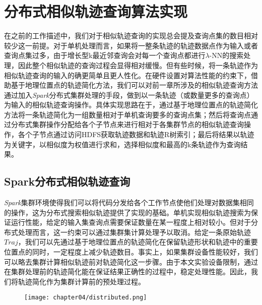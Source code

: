 

\section{分布式相似轨迹查询算法实现}
\label{sec:distributed algo}
在之前的工作描述中，我们对于相似轨迹查询的实现总会提及查询点集的数目相对较少这一前提。对于单机处理而言，如果将一整条轨迹的轨迹数据点作为输入或者查询点集过多，由于增长型k最近邻查询会对每一个查询点都进行$\lambda$-NN的搜索处理，因此整个相似轨迹的查询过程会显得相对缓慢。但有些时候，将一条轨迹作为相似轨迹查询的输入的确更简单且更人性化\cite{shang2014personalized}。在硬件设置对算法性能的约束下，借助基于地理位置点的轨迹简化方法，我们可以对前一章所涉及的相似轨迹查询方法通过加入\emph{Spark}分布式集群处理的手段，做到以一条轨迹（或数量更多的查询点）为输入的相似轨迹查询操作。具体实现思路在于，通过基于地理位置点的轨迹简化方法将一条轨迹简化为一组数量相对于单机查询要多的查询点集；然后将查询点通过分布式集群操作分配给各个子节点来进行相对于各集群节点的相似轨迹查询操作，各个子节点通过访问HDFS获取轨迹数据和轨迹R树索引；最后将结果以轨迹为关键字，以相似度为权值进行求和，选择相似度和最高的k条轨迹作为查询结果。


\subsection{Spark分布式相似轨迹查询}
\label{subsec:distributed similar}
\emph{Spark}集群环境使得我们可以将代码分发给各个工作节点使他们处理对数据集相同的操作，这为分布式搜索相似轨迹提供了实现的基础。单机实现相似轨迹搜索为保证运行性能，给定的输入集查询点需要保证数量在某一程度上相对较小。但对于分布式处理而言，这一约束可以通过集群集计算处理予以取消。给定一条原始轨迹$Traj$，我们可以先通过基于地理位置点的轨迹简化在保留轨迹形状和轨迹中的重要位置点的同时，一定程度上减少轨迹数目。事实上，如果集群设备性能较好，我们可以略去集群计算相似轨迹前对轨迹简化这一步骤。由于本文实验设备限制，通过在集群处理前的轨迹简化能在保证结果正确性的过程中，稳定处理性能。因此，我们将轨迹简化作为集群计算前的预处理过程。

\begin{figure}[!htp]
  \centering
  \texttt{[image: chapter04/distributed.png]}
\end{figure}

